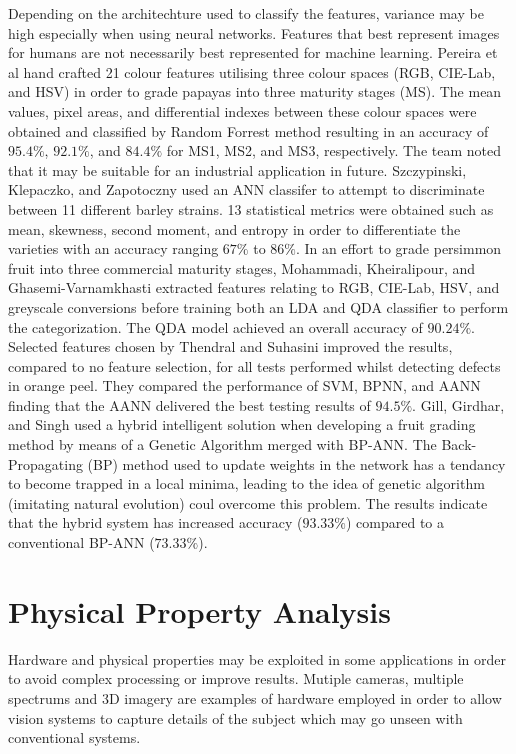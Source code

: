 \documentclass[fleqn,twoside,12pt]{report}
\begin{document}
Depending on the architechture used to classify the features, variance may be high especially when using neural networks. Features that best represent images for humans are not necessarily best represented for machine learning. Pereira et al \cite{pereira} hand crafted 21 colour features utilising three colour spaces (RGB, CIE-Lab, and HSV) in order to grade papayas into three maturity stages (MS). The mean values, pixel areas, and differential indexes between these colour spaces were obtained and classified by Random Forrest method resulting in an accuracy of $95.4\%$, $92.1\%$, and $84.4\%$ for MS1, MS2, and MS3, respectively. The team noted that it may be suitable for an industrial application in future. Szczypinski, Klepaczko, and Zapotoczny \cite{szczypinski} used an ANN classifer to attempt to discriminate between 11 different barley strains. 13 statistical metrics were obtained such as mean, skewness, second moment, and entropy in order to differentiate the varieties with an accuracy ranging $67\%$ to $86\%$. In an effort to grade persimmon fruit into three commercial maturity stages, Mohammadi, Kheiralipour, and Ghasemi-Varnamkhasti \cite{mohammadi} extracted features relating to RGB, CIE-Lab, HSV, and greyscale conversions before training both an LDA and QDA classifier to perform the categorization. The QDA model achieved an overall accuracy of $90.24\%$. Selected features chosen by Thendral and Suhasini \cite{thendral} improved the results, compared to no feature selection, for all tests performed whilst detecting defects in orange peel. They compared the performance of SVM, BPNN, and AANN finding that the AANN delivered the best testing results of $94.5\%$. Gill, Girdhar, and Singh \cite{gill} used a hybrid intelligent solution when developing a fruit grading method by means of a Genetic Algorithm merged with BP-ANN. The Back-Propagating (BP) method used to update weights in the network has a tendancy to become trapped in a local minima, leading to the idea of genetic algorithm (imitating natural evolution) coul overcome this problem. The results indicate that the hybrid system has increased accuracy ($93.33\%$) compared to a conventional BP-ANN ($73.33\%$).  



\section{Physical Property Analysis}

Hardware and physical properties may be exploited in some applications in order to avoid complex processing or improve results. Mutiple cameras, multiple spectrums and 3D imagery are examples of hardware employed in order to allow vision systems to capture details of the subject which may go unseen with conventional systems. 
\end{document}
